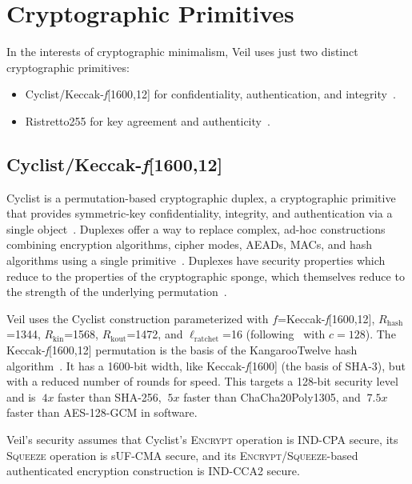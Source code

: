 \section{Cryptographic Primitives}\label{sec:cryptographic-primitives}

In the interests of cryptographic minimalism, Veil uses just two distinct cryptographic primitives:

\begin{itemize}
    \item Cyclist/Keccak-\emph{f}[1600,12] for confidentiality, authentication, and
    integrity~\cite{daemen2020,bertoni2018}.
    \item Ristretto255 for key agreement and authenticity~\cite{deValence2020}.
\end{itemize}

\subsection{Cyclist/Keccak-\emph{f}[1600,12]}\label{subsec:cyclist}

Cyclist is a permutation-based cryptographic duplex, a cryptographic primitive that provides symmetric-key
confidentiality, integrity, and authentication via a single object~\cite{daemen2020}.
Duplexes offer a way to replace complex, ad-hoc constructions combining encryption algorithms, cipher modes,
AEADs, MACs, and hash algorithms using a single primitive~\cite{daemen2020, bertoni2011duplex}.
Duplexes have security properties which reduce to the properties of the cryptographic sponge, which themselves reduce to
the strength of the underlying permutation~\cite{bertoni2008}.

Veil uses the Cyclist construction parameterized with $f$=Keccak-\emph{f}[1600,12], $R_\text{hash}$=1344,
$R_\text{kin}$=1568, $R_\text{kout}$=1472, and $\ell_\text{ratchet}$=16 (following~\cite{bertoni2015keyak} with $c=128$).
The Keccak-\emph{f}[1600,12] permutation is the basis of the KangarooTwelve hash algorithm~\cite{bertoni2018}.
It has a 1600-bit width, like Keccak-\emph{f}[1600] (the basis of SHA-3), but with a reduced number of rounds for speed.
This targets a 128-bit security level and is $~4x$ faster than SHA-256, $~5x$ faster than ChaCha20Poly1305, and $~7.5x$
faster than AES-128-GCM in software.

Veil's security assumes that Cyclist's \textsc{Encrypt} operation is IND-CPA secure, its
\textsc{Squeeze} operation is sUF-CMA secure, and its
\textsc{Encrypt}/\textsc{Squeeze}-based authenticated encryption construction is IND-CCA2 secure.

